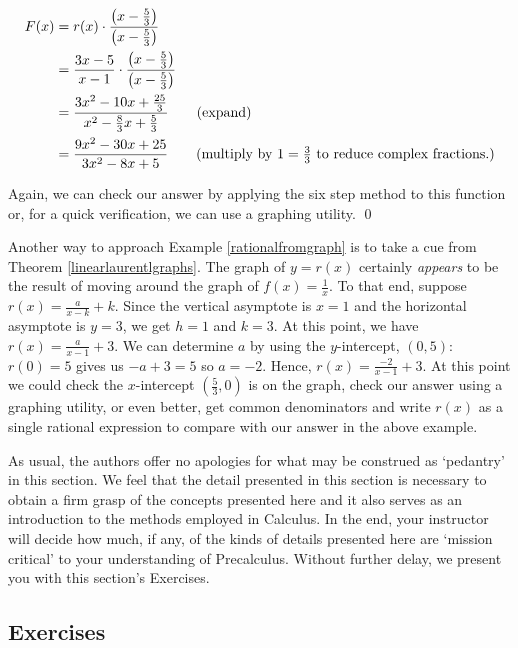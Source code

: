\begin{ex}
\begin{align*}
F(x) & = r(x) \cdot \dfrac{\left(x - \frac{5}{3} \right)}{\left(x - \frac{5}{3} \right)} \\
     & = \dfrac{3x-5}{x-1} \cdot \dfrac{\left(x - \frac{5}{3} \right)}{\left(x - \frac{5}{3} \right)} \\
     & = \dfrac{3x^2-10x+\frac{25}{3}}{x^2 - \frac{8}{3} x + \frac{5}{3}} \tag{expand}\\
     & = \dfrac{9x^2-30x+25}{3x^2-8x+5} \tag{multiply by $1 = \frac{3}{3}$ to reduce complex fractions.}\\
\end{align*}

Again, we can check our answer by applying the six step method to this function or, for a quick verification, we can use a graphing utility. \qed

\end{ex}

Another way to approach Example \ref{rationalfromgraph} is to take a cue from Theorem \ref{linearlaurentlgraphs}.  The graph of $y=r(x)$ certainly \textit{appears} to be the result of moving around the graph of $f(x) = \frac{1}{x}$.  To that end, suppose $r(x) = \frac{a}{x-k} + k$.  Since the vertical asymptote is $x=1$ and the horizontal asymptote is $y=3$, we get $h=1$ and $k=3$.  At this point, we have $r(x) = \frac{a}{x-1}+3$.  We can determine $a$ by using the $y$-intercept, $(0,5)$:  $r(0) =5$ gives us $-a+3 = 5$ so $a = -2$.  Hence, $r(x) = \frac{-2}{x-1}+3$.  At this point we could check the $x$-intercept  $\left(\frac{5}{3}, 0 \right)$ is on the graph, check our answer using a graphing utility, or even better, get common denominators and write $r(x)$ as a single rational expression to compare with our answer in the above example.  

As usual, the authors offer no apologies for what may be construed as `pedantry' in this section.  We feel that the detail presented in this section is necessary to obtain a firm grasp of the concepts presented here and it also serves as an introduction to the methods employed in Calculus. In the end,  your instructor will decide how much, if any, of the kinds of details presented here are `mission critical' to your understanding of Precalculus. Without further delay, we present you with this section's Exercises.

\clearpage

\subsection{Exercises}



\closegraphsfile